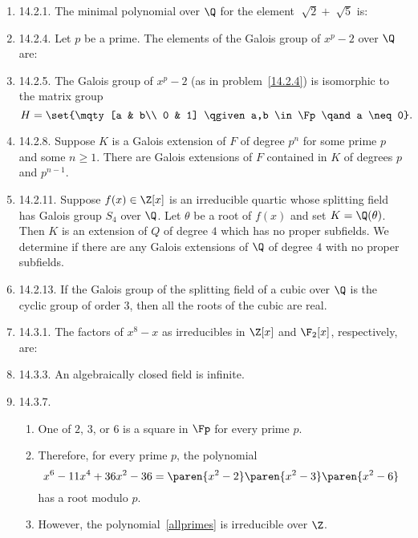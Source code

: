 \documentclass[onesided]{ccg-pset}
\author{Colton Grainger}
\date{\today}
\begin{document}
\maketitle

\begin{enumerate}

\item \label{14.2.1} 14.2.1.
The minimal polynomial over $\Q$ for the element $\sqrt[]{ 2 } + \sqrt[]{ 5 }$ is:



\item \label{14.2.4} 14.2.4. 
Let $p$ be a prime. The elements of the Galois group of $x^{p}-2$ over $\Q$ are:



\item \label{14.2.5} 14.2.5. 
The Galois group of $x^p-2$ (as in problem~\ref{14.2.4}) is isomorphic to the matrix group
\[
    H = \set{\mqty[a & b\\ 0 & 1] \qgiven a,b \in \Fp \qand a \neq 0}
.\]


\item \label{14.2.8} 14.2.8. 
Suppose $K$ is a Galois extension of $F$ of degree $p^n$ for some prime $p$ and some $n \ge 1$. 
There are Galois extensions of $F$ contained in $K$ of degrees $p$ and $p^{n-1}$.



\item \label{14.2.11} 14.2.11.
Suppose $f(x) \in \Z[x]$ is an irreducible quartic whose splitting field has Galois group $S_4$ over $\Q$. 
Let $\theta$ be a root of $f(x)$ and set $K = \Q(\theta)$. 
Then $K$ is an extension of $Q$ of degree $4$ which has no proper subfields.
We determine if there are any Galois extensions of $\Q$ of degree $4$ with no proper subfields.



\item \label{14.2.13} 14.2.13.
If the Galois group of the splitting field of a cubic over $\Q$ is the cyclic group of order $3$, then all the roots of the cubic are real.

\item \label{14.3.1} 14.3.1.
The factors of $x^8 - x$ as irreducibles in $\Z[x]$ and $\F_2[x]$, respectively, are:


\item \label{14.3.3} 14.3.3.
An algebraically closed field is infinite.


\item \label{14.3.7} 14.3.7.
\begin{enumerate}
    \item One of $2$, $3$, or $6$ is a square in $\Fp$ for every prime $p$.
    \item Therefore, for every prime $p$, the polynomial 
        \begin{equation}
            \label{allprimes}
        x^6 - 11x^{4} + 36x^{2} - 36 = \paren{x^{2} -2} \paren{x^{2} -3} \paren{x^{2} -6} 
        \end{equation}
        has a root modulo $p$.
    \item However, the polynomial~\eqref{allprimes} is irreducible over $\Z$.
\end{enumerate}



\end{enumerate}
\end{document}
